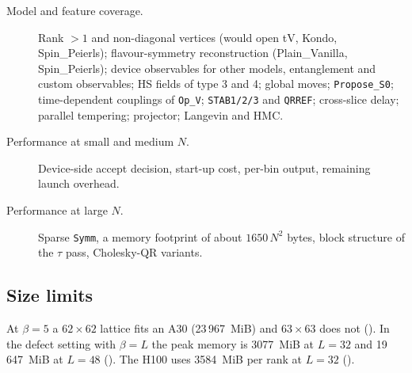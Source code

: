 \begin{description}
\item[Model and feature coverage.] Rank $>1$ and non-diagonal vertices (would open tV, Kondo, Spin\_Peierls); flavour-symmetry reconstruction (Plain\_Vanilla, Spin\_Peierls); device observables for other models, entanglement and custom observables; HS fields of type 3 and 4; global moves; \texttt{Propose\_S0}; time-dependent couplings of \texttt{Op\_V}; \texttt{STAB1/2/3} and \texttt{QRREF}; cross-slice delay; parallel tempering; projector; Langevin and HMC.
\item[Performance at small and medium $N$.] Device-side accept decision, start-up cost, per-bin output, remaining launch overhead.
\item[Performance at large $N$.] Sparse \texttt{Symm}, a memory footprint of about $1650\,N^2$ bytes, block structure of the $\tau$ pass, Cholesky-QR variants.
\end{description}

\subsection*{Size limits}

At $\beta=5$ a $62\times62$ lattice fits an A30 (23\,967~MiB) and $63\times63$ does not (). In the defect setting with $\beta=L$ the peak memory is 3077~MiB at $L=32$ and 19\,647~MiB at $L=48$ (). The H100 uses 3584~MiB per rank at $L=32$ ().
